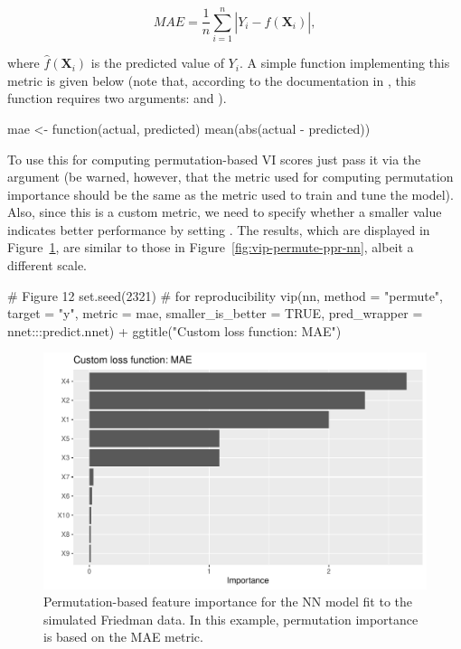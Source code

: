 \begin{equation}
  MAE = \frac{1}{n}\sum_{i = 1}^n\left|Y_i - \widehat{f}\left(\boldsymbol{X}_i\right)\right|,
\end{equation}

where $\widehat{f}\left(\boldsymbol{X}_i\right)$ is the predicted value of $Y_i$. A simple function implementing this metric is given below (note that, according to the documentation in , this function requires two arguments:  and ).

\begin{example}
mae <- function(actual, predicted) {
  mean(abs(actual - predicted))
}
\end{example}

To use this for computing permutation-based VI scores just pass it via the  argument (be warned, however, that the metric used for computing permutation importance should be the same as the metric used to train and tune the model). Also, since this is a custom metric, we need to specify whether a smaller value indicates better performance by setting . The results, which are displayed in Figure~\ref{fig:vip-nn-mae}, are similar to those in Figure~\ref{fig:vip-permute-ppr-nn}, albeit a different scale. 

\begin{example}
# Figure 12
set.seed(2321)  # for reproducibility
vip(nn, method = "permute", target = "y", metric = mae, 
    smaller_is_better = TRUE, pred_wrapper = nnet:::predict.nnet) +
  ggtitle("Custom loss function: MAE")
\end{example}

\begin{figure}[!htb]
  \centering
  \includegraphics[width=1\linewidth]{figures/vip-permute-nn-mae}
  \caption{Permutation-based feature importance for the NN model fit to the simulated Friedman data. In this example, permutation importance is based on the MAE metric.}
  \label{fig:vip-nn-mae}
\end{figure}

